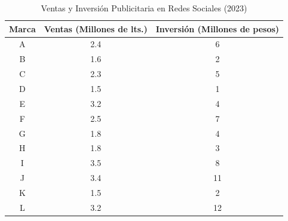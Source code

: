 \documentclass[10pt]{article}
\begin{document}
\begin{table}[H]
    \centering
    \caption{Ventas y Inversión Publicitaria en Redes Sociales (2023)}
    \label{tab:shampoo_datos}
    \begin{tabular}{|c|c|c|}
        \hline
        \textbf{Marca} & \textbf{Ventas (Millones de lts.)} & \textbf{Inversión (Millones de pesos)} \\
        \hline
        A & 2.4 & 6 \\
        B & 1.6 & 2 \\
        C & 2.3 & 5 \\
        D & 1.5 & 1 \\
        E & 3.2 & 4 \\
        F & 2.5 & 7 \\
        G & 1.8 & 4 \\
        H & 1.8 & 3 \\
        I & 3.5 & 8 \\
        J & 3.4 & 11 \\
        K & 1.5 & 2 \\
        L & 3.2 & 12 \\
        \hline
    \end{tabular}
\end{table}
\end{document}

